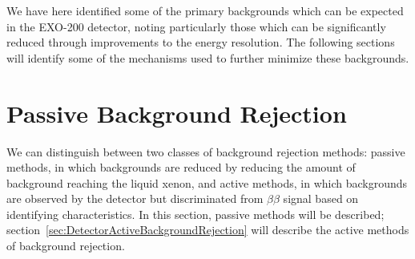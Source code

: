 We have here identified some of the primary backgrounds which can be expected in the EXO-200 detector, noting particularly those which can be significantly reduced through improvements to the energy resolution.  The following sections will identify some of the mechanisms used to further minimize these backgrounds.

\section{Passive Background Rejection}\label{sec:DetectorPassiveBackgroundRejection}

We can distinguish between two classes of background rejection methods: passive methods, in which backgrounds are reduced by reducing the amount of background reaching the liquid xenon, and active methods, in which backgrounds are observed by the detector but discriminated from $\beta\beta$ signal based on identifying characteristics.  In this section, passive methods will be described; section~\ref{sec:DetectorActiveBackgroundRejection} will describe the active methods of background rejection.

